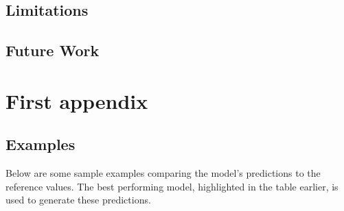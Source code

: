 \documentclass[logo,msc]{infthesis}           %
\begin{document}
\section{Limitations}

\section{Future Work}








\appendix

\chapter{First appendix}

\section{Examples}

Below are some sample examples comparing the model’s predictions to the reference values. The best performing model, highlighted in the table earlier, is used to generate these predictions.
\end{document}
